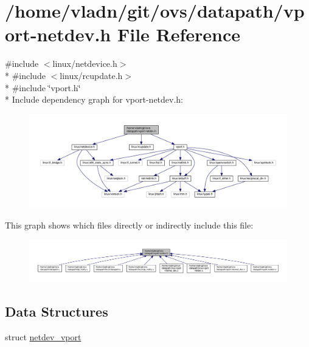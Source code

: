 \hypertarget{vport-netdev_8h}{}\section{/home/vladn/git/ovs/datapath/vport-\/netdev.h File Reference}
\label{vport-netdev_8h}
{\ttfamily \#include $<$linux/netdevice.\+h$>$}\\*
{\ttfamily \#include $<$linux/rcupdate.\+h$>$}\\*
{\ttfamily \#include \char`\"{}vport.\+h\char`\"{}}\\*
Include dependency graph for vport-\/netdev.h\+:
\nopagebreak
\begin{figure}[H]
\begin{center}
\leavevmode
\includegraphics[width=350pt]{vport-netdev_8h__incl}
\end{center}
\end{figure}
This graph shows which files directly or indirectly include this file\+:
\nopagebreak
\begin{figure}[H]
\begin{center}
\leavevmode
\includegraphics[width=350pt]{vport-netdev_8h__dep__incl}
\end{center}
\end{figure}
\subsection*{Data Structures}
\begin{DoxyCompactItemize}
\item 
struct \hyperlink{structnetdev__vport}{netdev\+\_\+vport}
\end{DoxyCompactItemize}
